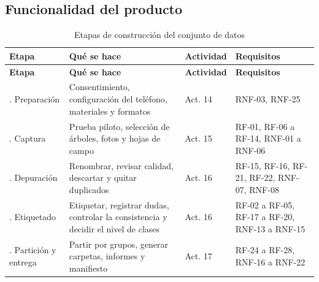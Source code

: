 \documentclass[11pt]{article}
\begin{document}
\subsection{Funcionalidad del producto}
{\small
\begin{longtable}{|>{\RaggedRight\arraybackslash}p{2.84cm}|>{\RaggedRight\arraybackslash}p{5.67cm}|>{\RaggedRight\arraybackslash}p{1.7cm}|>{\RaggedRight\arraybackslash}p{4.16cm}|}
\caption{Etapas de construcción del conjunto de datos}\\
\hline
\rowcolor{encabezado}\textbf{Etapa} & \textbf{Qué se hace} & \textbf{Actividad} & \textbf{Requisitos} \\ \hline
\endfirsthead
\hline
\rowcolor{encabezado}\textbf{Etapa} & \textbf{Qué se hace} & \textbf{Actividad} & \textbf{Requisitos} \\ \hline
\endhead
1. Preparación & Consentimiento, configuración del teléfono, materiales y formatos & Act. 14 & RNF-03, RNF-25 \\ \hline
2. Captura & Prueba piloto, selección de árboles, fotos y hojas de campo & Act. 15 & RF-01, RF-06 a RF-14, RNF-01 a RNF-06 \\ \hline
3. Depuración & Renombrar, revisar calidad, descartar y quitar duplicados & Act. 16 & RF-15, RF-16, RF-21, RF-22, RNF-07, RNF-08 \\ \hline
4. Etiquetado & Etiquetar, registrar dudas, controlar la consistencia y decidir el nivel de clases & Act. 16 & RF-02 a RF-05, RF-17 a RF-20, RNF-13 a RNF-15 \\ \hline
5. Partición y entrega & Partir por grupos, generar carpetas, informes y manifiesto & Act. 17 & RF-24 a RF-28, RNF-16 a RNF-22 \\ \hline
\end{longtable}}
\end{document}
